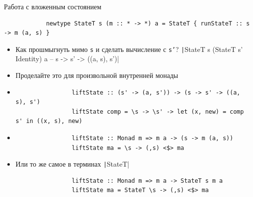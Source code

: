     \begin{frame}[fragile]{Работа с вложенным состоянием}
        \begin{verbatim}
            newtype StateT s (m :: * -> *) a = StateT { runStateT :: s -> m (a, s) }
        \end{verbatim}
        \begin{itemize}
            \item[\todo] Как прошмыгнуть мимо \texttt{s} и сделать вычисление с \texttt{s'}?
            \texttt|StateT s (StateT s' Identity) a -- s -> s' -> ((a, s), s')|
            \item[\todo] Проделайте это для произвольной внутренней монады
            \item[\answer] \pause
            \begin{verbatim}
                liftState :: (s' -> (a, s')) -> (s -> s' -> ((a, s), s')
                liftState comp = \s -> \s' -> let (x, new) = comp s' in ((x, s), new)
            \end{verbatim}
            \item[\answer] \pause
            \begin{verbatim}
                liftState :: Monad m => m a -> (s -> m (a, s))
                liftState ma = \s -> (,s) <$> ma
            \end{verbatim}
            \item Или то же самое в терминах \texttt|StateT|
            \begin{verbatim}
                liftState :: Monad m => m a -> StateT s m a
                liftState ma = StateT \s -> (,s) <$> ma
            \end{verbatim}
        \end{itemize}
    \end{frame}

